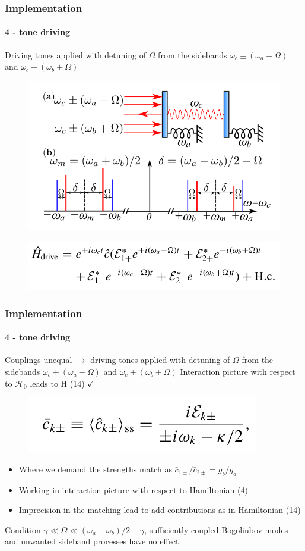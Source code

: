 \documentclass[aspectratio=43]{beamer}
\begin{document}
\begin{frame}
	
	\frametitle{Implementation}
	\framesubtitle{4 - tone driving}
	
	Driving tones applied with detuning of $\Omega$ from the sidebands $\omega_{c} \pm (\omega_{a} - \Omega)$ and $\omega_{c} \pm (\omega_{b} + \Omega)$
	
	\begin{figure}
		\includegraphics[width = 7 cm]{plots/plot_4_tone.png}
	\end{figure}	
	
	\begin{figure}
		\includegraphics[width = 8 cm]{plots/hamiltonian_4_tone.png}
	\end{figure}

\end{frame}

\begin{frame}
	
	\frametitle{Implementation}
	\framesubtitle{4 - tone driving}
	
	Couplings unequal $\longrightarrow$ driving tones applied with detuning of $\Omega$ from the sidebands $\omega_{c} \pm (\omega_{a} - \Omega)$ and $\omega_{c} \pm (\omega_{b} + \Omega)$
	Interaction picture with respect to $\mathcal{H}_{0}$ leads to H (14) $\checkmark$
	\begin{figure}
		\includegraphics[width = 5 cm]{plots/ss_4_tone.png}
	\end{figure}

	\begin{itemize}
		\item Where we demand the strengths match as $\bar{c}_{1\pm} / \bar{c}_{2\pm} = g_{b} / g_{a}$
		\item Working in interaction picture with respect to Hamiltonian (4)
		\item Imprecision in the matching lead to add contributions as in Hamiltonian (14)
	\end{itemize}

	Condition $\gamma \ll \Omega \ll (\omega_{a} - \omega_{b})/2 - \gamma$, {\color{blue}sufficiently coupled} Bogoliubov modes and unwanted sideband processes have no effect.

\end{frame}
\end{document}
